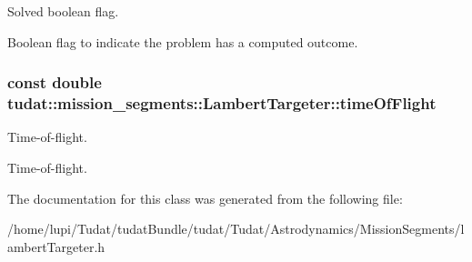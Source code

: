 Solved boolean flag. 

Boolean flag to indicate the problem has a computed outcome. 
\subsubsection[{\texorpdfstring{time\+Of\+Flight}{timeOfFlight}}]{\setlength{\rightskip}{0pt plus 5cm}const double tudat\+::mission\+\_\+segments\+::\+Lambert\+Targeter\+::time\+Of\+Flight\hspace{0.3cm}{\ttfamily [protected]}}\hypertarget{classtudat_1_1mission__segments_1_1LambertTargeter_a74f0ac221b22693ba7fe0b7398007e9b}{}\label{classtudat_1_1mission__segments_1_1LambertTargeter_a74f0ac221b22693ba7fe0b7398007e9b}


Time-\/of-\/flight. 

Time-\/of-\/flight. 

The documentation for this class was generated from the following file\+:\begin{DoxyCompactItemize}
\item 
/home/lupi/\+Tudat/tudat\+Bundle/tudat/\+Tudat/\+Astrodynamics/\+Mission\+Segments/lambert\+Targeter.\+h\end{DoxyCompactItemize}
